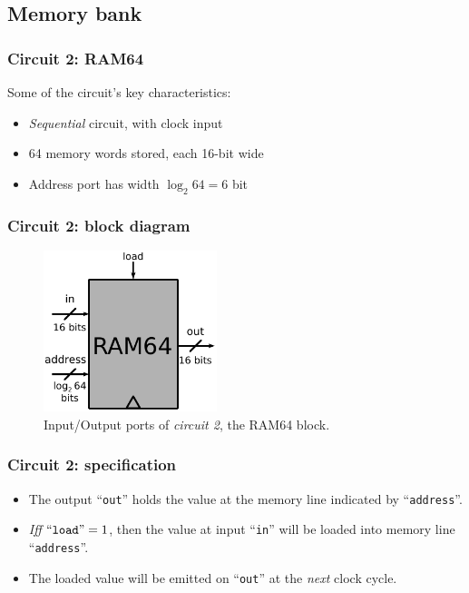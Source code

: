     \subsection{Memory bank}
    \label{subsec:memory-bank}
        \begin{frame}
            \frametitle{Circuit 2: RAM64}

            \par{Some of the circuit's key characteristics:}

            \begin{itemize}
                \item \emph{Sequential} circuit, with clock input
                \item 64 memory words stored, each 16-bit wide
                \item Address port has width $\log_{2} 64 = 6$ bit
            \end{itemize}
        \end{frame}

        \begin{frame}
            \frametitle{Circuit 2: block diagram}

            \begin{figure}[h!]
                \centerline{\includegraphics[width=0.45\textwidth]{imgs/ram-block.pdf}}
                \caption{Input/Output ports of \emph{circuit 2}, the RAM64 block.
                    \label{fig:ram-block}}
            \end{figure}
        \end{frame}

        \begin{frame}
            \frametitle{Circuit 2: specification}

            \begin{itemize}
                \item The output ``\texttt{out}'' holds the value at the memory line indicated by ``\texttt{address}''.
                \item \emph{Iff} $\text{``\texttt{load}''} = 1$,
                    then the value at input ``\texttt{in}'' will be loaded into memory line ``\texttt{address}''.
                \item The loaded value will be emitted on ``\texttt{out}'' at the \emph{next} clock cycle.
            \end{itemize}
        \end{frame}


